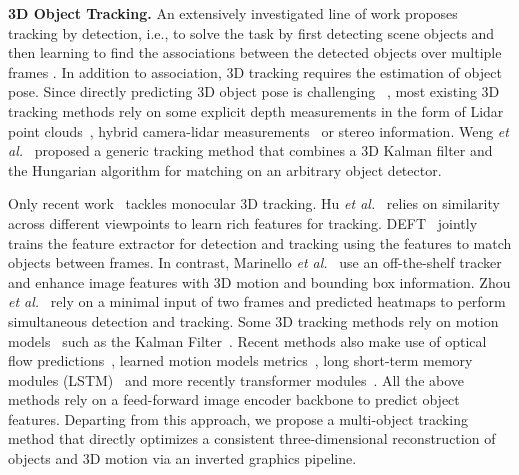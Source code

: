 \vspace{0.5\baselineskip}
\noindent
\textbf{3D Object Tracking.}
An extensively investigated line of work proposes tracking by detection, i.e., to solve the task by first detecting scene objects and then learning to find the associations between the detected objects over multiple frames \cite{breitenstein2009robust,kalal2011tracking,bewley2016simple,bergmann2019tracking,wojke2017simple, Wojke2018deep,cao2022observation}. In addition to association, 3D tracking requires the estimation of object pose. Since directly predicting 3D object pose is challenging ~\cite{huang2021joint}, most existing 3D tracking methods rely on some explicit depth measurements in the form of Lidar point clouds~\cite{dewan2016motion,alvarez2019people, yin2021center}, hybrid camera-lidar measurements~\cite{huang2021joint} or stereo information\cite{gladkova2022directtracker,osep2017combined}. Weng \emph{et al.}~\cite{weng2020AB3DMOT} proposed a generic tracking method that combines a 3D Kalman filter and the Hungarian algorithm for matching on an arbitrary object detector. 

Only recent work~\cite{hu2021QD3DT, marinello2022triplettrack, chaabane2021deft,zhou2020CenterTrack,wu2021trades} tackles monocular 3D tracking. Hu \emph{et al.}~\cite{hu2021QD3DT} relies on similarity across different viewpoints to learn rich features for tracking. DEFT~\cite{chaabane2021deft} jointly trains the feature extractor for detection and tracking using the features to match objects between frames. In contrast, Marinello \emph{et al.}~\cite{marinello2022triplettrack} use an off-the-shelf tracker and enhance image features with 3D motion and bounding box information. Zhou \emph{et al.}~\cite{zhou2020CenterTrack} rely on a minimal input of two frames and predicted heatmaps to perform simultaneous detection and tracking. %
Some 3D tracking methods rely on motion models~\cite{scheidegger2018mono, chen2011kalman, nguyen2004fast} such as the Kalman Filter~\cite{kalman1960new}. Recent methods also make use of 
optical flow predictions~\cite{luiten2020track}, learned motion models metrics~\cite{yang2022qtrack}, long short-term memory modules (LSTM)~\cite{hu2021QD3DT, chaabane2021deft, marinello2022triplettrack} and more recently transformer modules~\cite{pang2023PFtrack, wang2023StreamPETR}.
All the above methods rely on a feed-forward image encoder backbone to predict object features. Departing from this approach, we propose a multi-object tracking method that directly optimizes a consistent three-dimensional reconstruction of objects and 3D motion via an inverted graphics pipeline. %

